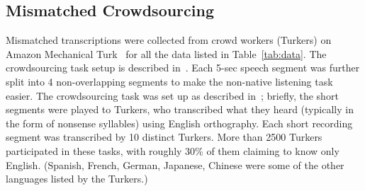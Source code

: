 \subsection{Mismatched Crowdsourcing}
\label{sec:methodsmc}

Mismatched transcriptions were collected from crowd workers (Turkers)
on Amazon Mechanical Turk~\cite{MTurk} for all the data listed in
Table~\ref{tab:data}.  The crowdsourcing task setup is described
in~\cite{JHJ15b}.  Each 5-sec speech segment was further split into 4
non-overlapping segments to make the non-native listening task
easier. The crowdsourcing task was set up as described
in~\cite{JHJ15b}; briefly, the short segments were played to Turkers,
who transcribed what they heard (typically in the form of nonsense
syllables) using English orthography. Each short recording segment was
transcribed by 10 distinct Turkers. More than 2500 Turkers
participated in these tasks, with roughly 30\% of them claiming to
know only English. (Spanish, French, German, Japanese, Chinese were
some of the other languages listed by the Turkers.)

